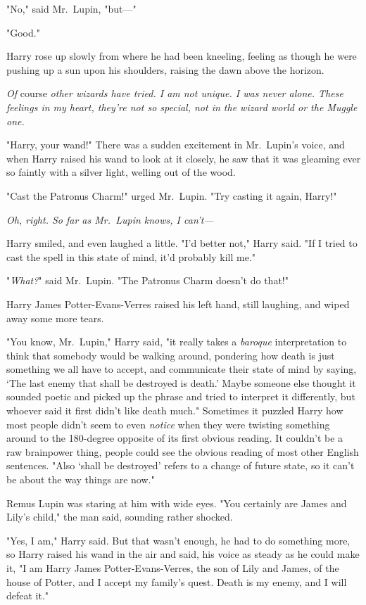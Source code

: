 "No," said Mr.~Lupin, "but—"

"Good."

Harry rose up slowly from where he had been kneeling, feeling as though he were
pushing up a sun upon his shoulders, raising the dawn above the horizon.

\emph{Of} course \emph{other wizards have tried. I am not unique. I was never
alone. These feelings in my heart, they're not so special, not in the wizard
world or the Muggle one.}

"Harry, your wand!" There was a sudden excitement in Mr.~Lupin's voice, and
when Harry raised his wand to look at it closely, he saw that it was gleaming
ever so faintly with a silver light, welling out of the wood.

"Cast the Patronus Charm!" urged Mr.~Lupin. "Try casting it again, Harry!"

\emph{Oh, right. So far as Mr.~Lupin knows, I can't—}

Harry smiled, and even laughed a little. "I'd better not," Harry said. "If I
tried to cast the spell in this state of mind, it'd probably kill me."

"\emph{What?}" said Mr.~Lupin. "The Patronus Charm doesn't do that!"

Harry James Potter-Evans-Verres raised his left hand, still laughing, and wiped
away some more tears.

"You know, Mr.~Lupin," Harry said, "it really takes a \emph{baroque}
interpretation to think that somebody would be walking around, pondering how
death is just something we all have to accept, and communicate their state of
mind by saying, `The last enemy that shall be destroyed is death.' Maybe
someone else thought it sounded poetic and picked up the phrase and tried to
interpret it differently, but whoever said it first didn't like death much."
Sometimes it puzzled Harry how most people didn't seem to even \emph{notice}
when they were twisting something around to the 180-degree opposite of its
first obvious reading. It couldn't be a raw brainpower thing, people could see
the obvious reading of most other English sentences. "Also `shall be destroyed'
refers to a change of future state, so it can't be about the way things are
now."

Remus Lupin was staring at him with wide eyes. "You certainly are James and
Lily's child," the man said, sounding rather shocked.

"Yes, I am," Harry said. But that wasn't enough, he had to do something more,
so Harry raised his wand in the air and said, his voice as steady as he could
make it, "I am Harry James Potter-Evans-Verres, the son of Lily and James, of
the house of Potter, and I accept my family's quest. Death is my enemy, and I
will defeat it."

